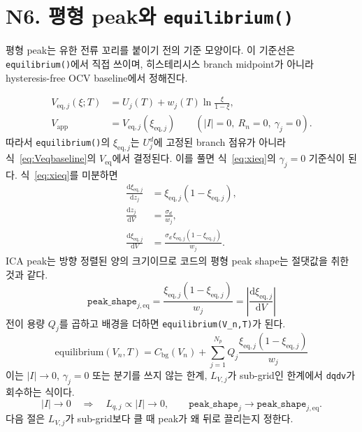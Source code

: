 \documentclass[11pt,a4paper]{article}
\newcommand{\dd}{\mathrm{d}}
\newcommand{\eq}{\mathrm{eq}}
\newcommand{\app}{\mathrm{app}}
\newcommand{\bg}{\mathrm{bg}}
\begin{document}
\section{N6. 평형 peak와 \texttt{equilibrium()}}\label{sec:N6}
평형 peak는 유한 전류 꼬리를 붙이기 전의 기준 모양이다. 이 기준선은 \texttt{equilibrium()}에서 직접 쓰이며, 히스테리시스 branch midpoint가 아니라 hysteresis-free OCV baseline에서 정해진다.

\begin{align}
V_{\eq,j}(\xi;T)&=U_j(T)+w_j(T)\ln\frac{\xi}{1-\xi},\label{eq:Veqbaseline}\\
V_{\app}&=V_{\eq,j}(\xi_{\eq,j})
\qquad (|I|=0,\ R_n=0,\ \gamma_j=0).\label{eq:VappVeqxieq}
\end{align}
따라서 \texttt{equilibrium()}의 $\xi_{\eq,j}$는 $U_j^d$에 고정된 branch 점유가 아니라 식~\eqref{eq:Veqbaseline}의 $V_{\eq}$에서 결정된다. 이를 풀면 식~\eqref{eq:xieq}의 $\gamma_j=0$ 기준식이 된다. 식~\eqref{eq:xieq}를 미분하면
\begin{align}
\frac{\dd \xi_{\eq,j}}{\dd z_j}
&=\xi_{\eq,j}(1-\xi_{\eq,j}),\label{eq:dxidz}\\
\frac{\dd z_j}{\dd V}
&=\frac{\sigma_d}{w_j},\label{eq:dzdV}\\
\frac{\dd \xi_{\eq,j}}{\dd V}
&=\frac{\sigma_d\,\xi_{\eq,j}(1-\xi_{\eq,j})}{w_j}.
\label{eq:dxidVsig}
\end{align}
ICA peak는 방향 정렬된 양의 크기이므로 코드의 평형 peak shape는 절댓값을 취한 것과 같다.
\begin{equation}
\boxed{\;\texttt{peak\_shape}_{j,\eq}
=\frac{\xi_{\eq,j}(1-\xi_{\eq,j})}{w_j}
=\left|\frac{\dd \xi_{\eq,j}}{\dd V}\right|\;}
\label{eq:eqpeakshape}
\end{equation}
전이 용량 $Q_j$를 곱하고 배경을 더하면 \texttt{equilibrium(V\_n,T)}가 된다.
\begin{equation}
\boxed{\;\mathrm{equilibrium}(V_n,T)
=C_{\bg}(V_n)+\sum_{j=1}^{N_p}Q_j\frac{\xi_{\eq,j}(1-\xi_{\eq,j})}{w_j}\;}
\label{eq:equilibrium}
\end{equation}
이는 $|I|\to0$, $\gamma_j=0$ 또는 분기를 쓰지 않는 한계, $L_{V,j}$가 sub-grid인 한계에서 \texttt{dqdv}가 회수하는 식이다.
\begin{equation}
|I|\to0\quad\Longrightarrow\quad
L_{q,j}\propto |I|\to0,\qquad
\texttt{peak\_shape}_j\to\texttt{peak\_shape}_{j,\eq}.
\label{eq:equilimit}
\end{equation}
다음 절은 $L_{V,j}$가 sub-grid보다 클 때 peak가 왜 뒤로 끌리는지 정한다.
\end{document}
